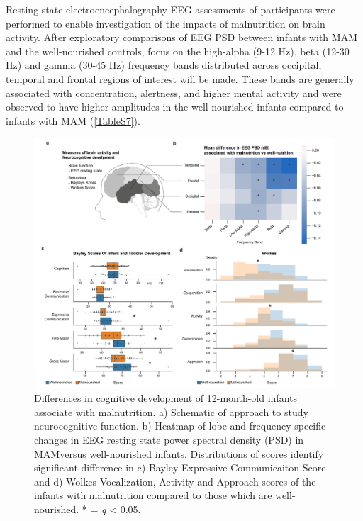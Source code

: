 \documentclass{article}
\begin{document}
Resting state electroencephalography \gls{EEG} assessments of participants were performed to enable investigation of the impacts of malnutrition on brain activity.
After exploratory comparisons of \gls{EEG} \gls{PSD} between infants with \gls{MAM} and the well-nourished controls, focus on the high-alpha (9-12 Hz), beta (12-30 Hz) and gamma (30-45 Hz) frequency bands distributed across occipital, temporal and frontal regions of interest will be made.
These bands are generally associated with concentration, alertness, and higher mental activity and were observed to have higher amplitudes in the well-nourished infants compared to infants with \gls{MAM} (\autoref{TableS7}).

\begin{figure}[!htb]
\centering
\includegraphics[scale=1.4]{../../figures/Figure2-brain.pdf}
\caption[Differences in cognitive development of 12-month-old infants associate with malnutrition]{
	Differences in cognitive development of 12-month-old infants associate with malnutrition.
	a) Schematic of approach to study neurocognitive function.
	b) Heatmap of lobe and frequency specific changes in EEG resting state power spectral density (PSD) in MAMversus well-nourished infants.
	Distributions of scores identify significant difference in c) Bayley Expressive Communicaiton Score and d) Wolkes Vocalization, Activity and Approach scores of the infants with malnutrition compared to those which are well-nourished.
	* = \textit{q} \textless{} 0.05.}
\label{Figure2}
\end{figure}
\end{document}
